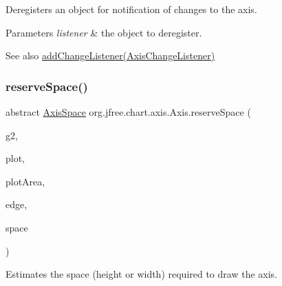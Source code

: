 Deregisters an object for notification of changes to the axis.


\begin{DoxyParams}{Parameters}
{\em listener} & the object to deregister.\\
\hline
\end{DoxyParams}
\begin{DoxySeeAlso}{See also}
\mbox{\hyperlink{classorg_1_1jfree_1_1chart_1_1axis_1_1_axis_a5529aef8c91a529add5a138bb2d0552a}{add\+Change\+Listener(\+Axis\+Change\+Listener)}} 
\end{DoxySeeAlso}
\mbox{\label{classorg_1_1jfree_1_1chart_1_1axis_1_1_axis_a888f0a481bd8b1dbf8e9c278ca4dceca}} 
\subsubsection{\texorpdfstring{reserve\+Space()}{reserveSpace()}}
{\footnotesize\ttfamily abstract \mbox{\hyperlink{classorg_1_1jfree_1_1chart_1_1axis_1_1_axis_space}{Axis\+Space}} org.\+jfree.\+chart.\+axis.\+Axis.\+reserve\+Space (\begin{DoxyParamCaption}\item[{Graphics2D}]{g2,  }\item[{\mbox{\hyperlink{classorg_1_1jfree_1_1chart_1_1plot_1_1_plot}{Plot}}}]{plot,  }\item[{Rectangle2D}]{plot\+Area,  }\item[{Rectangle\+Edge}]{edge,  }\item[{\mbox{\hyperlink{classorg_1_1jfree_1_1chart_1_1axis_1_1_axis_space}{Axis\+Space}}}]{space }\end{DoxyParamCaption})\hspace{0.3cm}{\ttfamily [abstract]}}

Estimates the space (height or width) required to draw the axis.


